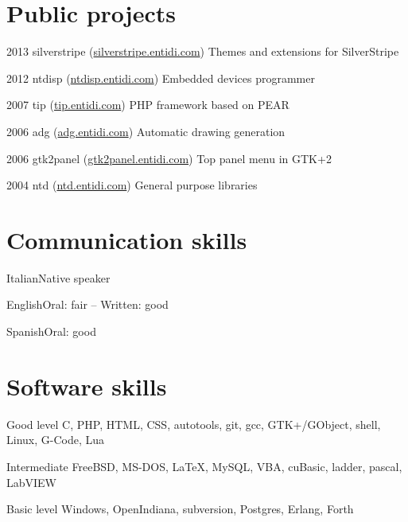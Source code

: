 \documentclass[fontsize=10pt]{tccv}
\begin{document}
\section{Public projects}

\begin{yearlist}

\item{2013}
     {silverstripe (\href{http://silverstripe.entidi.com/}{silverstripe.entidi.com})}
     {Themes and extensions for SilverStripe}

\item{2012}
     {ntdisp (\href{http://ntdisp.entidi.com/}{ntdisp.entidi.com})}
     {Embedded devices programmer}

\item{2007}
     {tip (\href{http://tip.entidi.com/}{tip.entidi.com})}
     {PHP framework based on PEAR}

\item{2006}
     {adg (\href{http://adg.entidi.com/}{adg.entidi.com})}
     {Automatic drawing generation}

\item{2006}
     {gtk2panel (\href{http://gtk2panel.entidi.com/}{gtk2panel.entidi.com})}
     {Top panel menu in GTK+2}

\item{2004}
     {ntd (\href{http://ntd.entidi.com/}{ntd.entidi.com})}
     {General purpose libraries}

\end{yearlist}

\section{Communication skills}

\begin{factlist}
\item{Italian}{Native speaker}
\item{English}{Oral: fair -- Written: good}
\item{Spanish}{Oral: good}
\end{factlist}

\section{Software skills}

\begin{factlist}

\item{Good level}
     {C, PHP, HTML, CSS, autotools, git, gcc, GTK+/GObject, shell,
      Linux, G-Code, Lua}

\item{Intermediate}
     {FreeBSD, MS-DOS, \LaTeX, MySQL, VBA, cuBasic, ladder, pascal,
      LabVIEW}

\item{Basic level}
     {Windows, OpenIndiana, subversion,  Postgres, Erlang, Forth}

\end{factlist}
\end{document}

